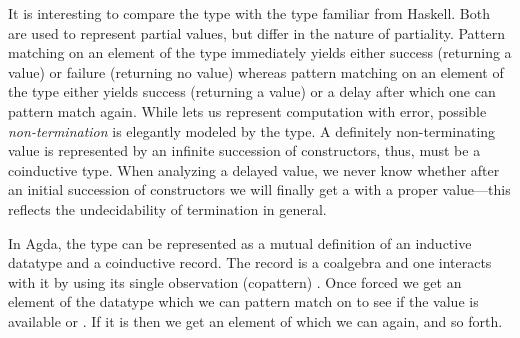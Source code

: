 \documentclass[preliminary,copyright,creativecommons]{eptcs}
\newcommand{\force}{\AgdaField{force}}
\begin{document}
It is interesting to compare the  type with the
 type familiar from Haskell. Both are used to represent
partial values, but differ in the nature of partiality.
Pattern matching on an element of the
 type immediately yields either success (returning a value)
or failure (returning no value) whereas pattern matching on an element
of the  type either yields success (returning a value) or
a delay after which one can pattern match again.  While 
lets us represent computation with error, possible \emph{non-termination} is
elegantly modeled by the  type.
A definitely non-terminating value is represented by an infinite
succession of  constructors, thus,  must be a
coinductive type.  When analyzing a delayed value, we never know
whether after an initial succession of  constructors we will
finally get a  with a proper value---this reflects the
undecidability of termination in general.


In Agda, the  type can be represented as a mutual
definition of an inductive datatype and a coinductive record.
The record  is a coalgebra
and one interacts with it by using its single
observation (copattern) \force. Once forced we get an element of
the  datatype which we can pattern match on to see if the
value is available  or . If it is 
then we get an element of  which we can \force{}
again, and so forth.
\end{document}
